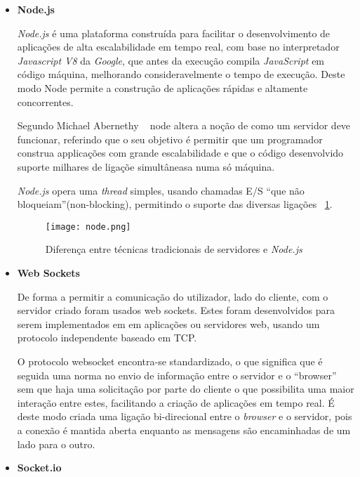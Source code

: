 \begin{itemize}

\item \textbf{Node.js}


\textit{Node.js} é uma plataforma construída para facilitar o desenvolvimento de aplicações de alta escalabilidade em tempo real, com base no interpretador \textit{Javascript V8} da \textit{Google}, que antes da execução compila \textit{JavaScript} em código máquina, melhorando consideravelmente o tempo de execução. Deste modo Node permite a construção de aplicações rápidas e altamente concorrentes.

Segundo Michael Abernethy ~\cite{Abernethy2011} node altera a noção de como um servidor deve funcionar, referindo que o seu objetivo é permitir que um programador construa applicações com grande escalabilidade e que o código desenvolvido suporte milhares de ligaçõe simultâneasa numa só máquina. 

\textit{Node.js} opera uma \textit{thread} simples, usando chamadas E/S “que não bloqueiam”(non-blocking), permitindo o suporte das diversas ligações ~\ref{fig:node}.

\begin{figure}[ht]
\centering
\texttt{[image: node.png]}
\caption[\textit{Node.js}] {Diferença entre técnicas tradicionais de servidores e \textit{Node.js}\protect\footnotemark}
\label{fig:node}
\end{figure}


\item \textbf{Web Sockets}

De forma a permitir a comunicação do utilizador, lado do cliente, com o servidor criado foram usados web sockets. Estes foram desenvolvidos para serem implementados em em aplicações ou servidores web, usando um protocolo independente baseado em TCP.

O protocolo websocket encontra-se standardizado, o que significa que é seguida uma norma no envio de informação entre o servidor e o “browser” sem que haja uma solicitação por parte do cliente o que possibilita uma maior interação entre estes, facilitando a criação de aplicações em tempo real. É deste modo criada uma ligação bi-direcional entre o \textit{browser} e o servidor, pois a conexão é mantida aberta enquanto as mensagens são encaminhadas de um lado para o outro.


\item \textbf{Socket.io}


\end{itemize}
